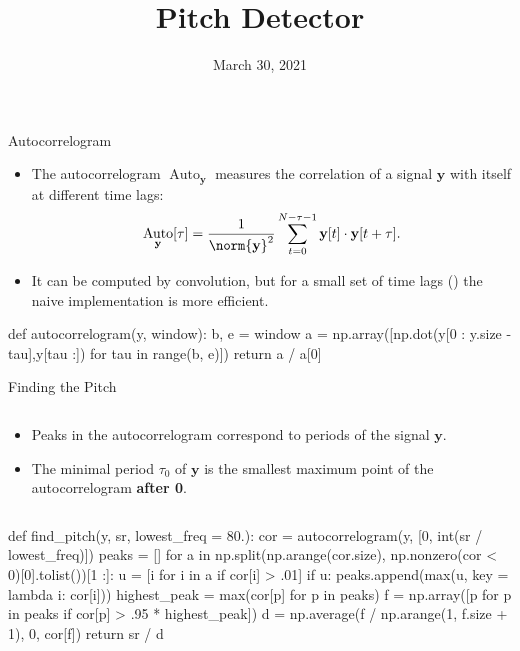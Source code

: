 \documentclass[10pt]{beamer}
\date{March 30, 2021}
\title{Pitch Detector}
\DeclareMathOperator{\Auto}{Auto}
\begin{document}
\def\yy{\mathbf{y}}

\frame{\titlepage}
\begin{frame}[fragile]{Autocorrelogram}
\begin{itemize}
\item The autocorrelogram $\Auto_{\yy}$ measures the correlation of a signal $\yy$ with itself at different time lags:
\[
\Auto_{\yy}[\tau]=\frac{1}{\norm{\yy}^2}\sum_{t=0}^{N-\tau-1}\yy[t]\cdot\yy[t+\tau].
\]
\item It can be computed by convolution, but for a small set of time lags () the naive implementation is more efficient.
\end{itemize}
\vspace{.2cm}
\begin{python}
def autocorrelogram(y, window):
    b, e = window
    a = np.array([np.dot(y[0 : y.size - tau],y[tau :])
        for tau in range(b, e)])
    return a / a[0]
\end{python}
\end{frame}
\begin{frame}[fragile]{Finding the Pitch}
\begin{columns}
\begin{column}{.5\textwidth}
\begin{itemize}
\item Peaks in the autocorrelogram correspond to periods of the signal $\yy$.
\item The minimal period $\tau_0$ of $\yy$ is the smallest maximum point of the autocorrelogram \textbf{after 0}.
\end{itemize}
\end{column}
\begin{column}{.5\textwidth}
\begin{center}
\resizebox{\textwidth}{!}{}
\end{center}
\end{column}
\end{columns}
\vspace{.2cm}
\begin{python}
def find_pitch(y, sr, lowest_freq = 80.):
    cor = autocorrelogram(y, [0, int(sr / lowest_freq)])
    peaks = []
    for a in np.split(np.arange(cor.size),
		np.nonzero(cor < 0)[0].tolist())[1 :]:
	        u = [i for i in a if cor[i] > .01]
	        if u:
	            peaks.append(max(u, key = lambda i: cor[i]))
    highest_peak = max(cor[p] for p in peaks)
    f = np.array([p for p in peaks
			if cor[p] > .95 * highest_peak])
    d = np.average(f / np.arange(1, f.size + 1), 0, cor[f])
    return sr / d
\end{python}
\end{frame}
\end{document}
